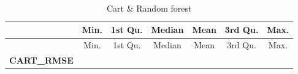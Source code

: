 \documentclass[
]{article}
\begin{document}
\begin{longtable}[]{@{}ccccccc@{}}
\caption{Cart \& Random forest}\tabularnewline
\toprule
\begin{minipage}[b]{0.21\columnwidth}\centering
~\strut
\end{minipage} & \begin{minipage}[b]{0.09\columnwidth}\centering
Min.\strut
\end{minipage} & \begin{minipage}[b]{0.10\columnwidth}\centering
1st Qu.\strut
\end{minipage} & \begin{minipage}[b]{0.09\columnwidth}\centering
Median\strut
\end{minipage} & \begin{minipage}[b]{0.09\columnwidth}\centering
Mean\strut
\end{minipage} & \begin{minipage}[b]{0.10\columnwidth}\centering
3rd Qu.\strut
\end{minipage} & \begin{minipage}[b]{0.10\columnwidth}\centering
Max.\strut
\end{minipage}\tabularnewline
\midrule
\endfirsthead
\toprule
\begin{minipage}[b]{0.21\columnwidth}\centering
~\strut
\end{minipage} & \begin{minipage}[b]{0.09\columnwidth}\centering
Min.\strut
\end{minipage} & \begin{minipage}[b]{0.10\columnwidth}\centering
1st Qu.\strut
\end{minipage} & \begin{minipage}[b]{0.09\columnwidth}\centering
Median\strut
\end{minipage} & \begin{minipage}[b]{0.09\columnwidth}\centering
Mean\strut
\end{minipage} & \begin{minipage}[b]{0.10\columnwidth}\centering
3rd Qu.\strut
\end{minipage} & \begin{minipage}[b]{0.10\columnwidth}\centering
Max.\strut
\end{minipage}\tabularnewline
\midrule
\endhead
\begin{minipage}[t]{0.21\columnwidth}\centering
\textbf{CART\_RMSE}\strut
\end{minipage} & \begin{minipage}[t]{0.09\columnwidth}\centering

\end{minipage}
\end{longtable}
\end{document}
